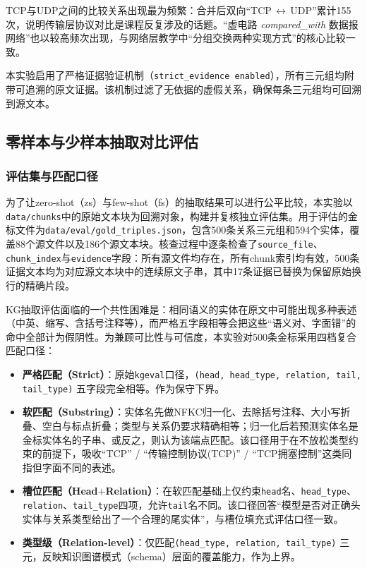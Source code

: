 TCP与UDP之间的比较关系出现最为频繁：合并后双向“TCP\,$\leftrightarrow$\,UDP”累计155次，说明传输层协议对比是课程反复涉及的话题。“虚电路 \textit{compared\_with} 数据报网络”也以较高频次出现，与网络层教学中“分组交换两种实现方式”的核心比较一致。

本实验启用了严格证据验证机制（\texttt{strict\_evidence enabled}），所有三元组均附带可追溯的原文证据。该机制过滤了无依据的虚假关系，确保每条三元组均可回溯到源文本。

\subsection{零样本与少样本抽取对比评估}

\subsubsection{评估集与匹配口径}
\label{sec:5-zsfs-protocol}

为了让zero-shot（zs）与few-shot（fs）的抽取结果可以进行公平比较，本实验以\texttt{data/chunks}中的原始文本块为回溯对象，构建并复核独立评估集。用于评估的金标文件为\texttt{data/eval/gold\_triples.json}，包含500条关系三元组和594个实体，覆盖88个源文件以及186个源文本块。核查过程中逐条检查了\texttt{source\_file}、\texttt{chunk\_index}与\texttt{evidence}字段：所有源文件均存在，所有chunk索引均有效，500条证据文本均为对应源文本块中的连续原文子串，其中17条证据已替换为保留原始换行的精确片段。

KG抽取评估面临的一个共性困难是：相同语义的实体在原文中可能出现多种表述（中英、缩写、含括号注释等），而严格五字段相等会把这些“语义对、字面错”的命中全部计为假阴性。为兼顾可比性与可信度，本实验对500条金标采用四档复合匹配口径：

\begin{itemize}
  \item \textbf{严格匹配（Strict）}：原始\texttt{kgeval}口径，\texttt{(head, head\_type, relation, tail, tail\_type)} 五字段完全相等。作为保守下界。
  \item \textbf{软匹配（Substring）}：实体名先做NFKC归一化、去除括号注释、大小写折叠、空白与标点折叠；类型与关系仍要求精确相等；归一化后若预测实体名是金标实体名的子串、或反之，则认为该端点匹配。该口径用于在不放松类型约束的前提下，吸收“TCP” / “传输控制协议(TCP)” / “TCP拥塞控制”这类同指但字面不同的表述。
  \item \textbf{槽位匹配（Head$+$Relation）}：在软匹配基础上仅约束\texttt{head}名、\texttt{head\_type}、\texttt{relation}、\texttt{tail\_type}四项，允许\texttt{tail}名不同。该口径回答“模型是否对正确头实体与关系类型给出了一个合理的尾实体”，与槽位填充式评估口径一致。
  \item \textbf{类型级（Relation-level）}：仅匹配\texttt{(head\_type, relation, tail\_type)} 三元，反映知识图谱模式（schema）层面的覆盖能力，作为上界。
\end{itemize}

